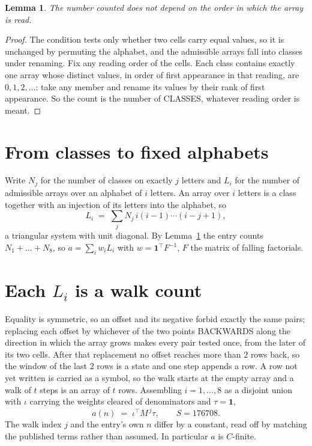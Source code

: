 \documentclass[11pt,a4paper]{article}
\theoremstyle{plain}
\newtheorem{lemma}[theorem]{Lemma}
\theoremstyle{definition}
\begin{document}
\begin{lemma}\label{lem:order}
The number counted does not depend on the order in which the array is read.
\end{lemma}

\begin{proof}
The condition tests only whether two cells carry equal values, so it is unchanged by permuting
the alphabet, and the admissible arrays fall into classes under renaming. Fix any reading order
of the cells. Each class contains exactly one array whose distinct values, in order of first
appearance in that reading, are $0,1,2,\dots$: take any member and rename its values by their
rank of first appearance. So the count is the number of CLASSES, whatever reading order is
meant.
\end{proof}

\section{From classes to fixed alphabets}

Write $N_j$ for the number of classes on exactly $j$ letters and $L_i$ for the number of
admissible arrays over an alphabet of $i$ letters. An array over $i$ letters is a class together
with an injection of its letters into the alphabet, so
\[
L_i\;=\;\sum_j N_j\,i(i-1)\cdots(i-j+1),
\]
a triangular system with unit diagonal. By Lemma~\ref{lem:order} the entry counts
$N_1+\dots+N_{8}$, so $a=\sum_i w_iL_i$ with $w=\mathbf{1}^{\!\top}F^{-1}$, $F$ the
matrix of falling factorials.

\section{Each $L_i$ is a walk count}

Equality is symmetric, so an offset and its negative forbid exactly the same pairs; replacing
each offset by whichever of the two points BACKWARDS along the direction in which the array
grows makes every pair tested once, from the later of its two cells. After that replacement no
offset reaches more than $2$ rows back, so the window of the last $2$
rows is a state and one step appends a row. A row not yet written is
carried as a symbol, so the walk starts at the empty array and a walk of $t$ steps is an array
of $t$ rows. Assembling $i=1,\dots,8$ as a disjoint union with $\iota$ carrying the
weights cleared of denominators and $\tau=\mathbf{1}$,
\[
a(n)\;=\;\iota^{\!\top}M^{\,j}\tau ,\qquad S=176708.
\]
The walk index $j$ and the entry's own $n$ differ by a constant, read off by matching the
published terms rather than assumed. In particular $a$ is $C$-finite.
\end{document}
